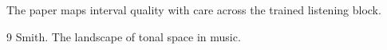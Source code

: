 \documentclass{article}
\begin{document}
The paper maps interval quality with care across the trained listening block.
\begin{thebibliography}{9}
 Smith. The landscape of tonal space in music.
\end{thebibliography}
\end{document}
